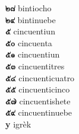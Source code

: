 \textbf{ ๒๘  } bintiocho \\
\textbf{ ๒๙  } bintinuebe \\
\textbf{ ๕  } cincuentiun \\
\textbf{ ๕๐  } cincuenta \\
\textbf{ ๕๑  } cincuentiun \\
\textbf{ ๕๓  } cincuentitres \\
\textbf{ ๕๔  } cincuenticuatro \\
\textbf{ ๕๕  } cincuenticinco \\
\textbf{ ๕๗  } cincuentishete \\
\textbf{ ๕๙  } cincuentinuebe \\
\textbf{y } igrèk \\
